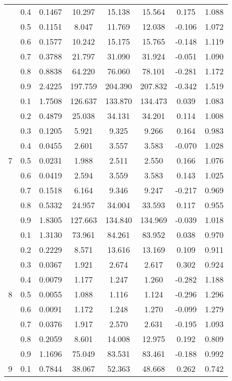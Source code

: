 \documentclass[11pt,a4paper]{report}
\begin{document}
\begin{longtable}{ | c | c || c | c | c | c | c | c | }
 & 0.4 & 0.1467 & 10.297 & 15.138 & 15.564 & 0.175 & 1.088 \\
 & 0.5 & 0.1151 & 8.047 & 11.769 & 12.038 & -0.106 & 1.072 \\
 & 0.6 & 0.1577 & 10.242 & 15.175 & 15.765 & -0.148 & 1.119 \\
 & 0.7 & 0.3788 & 21.797 & 31.090 & 31.924 & -0.051 & 1.090 \\
 & 0.8 & 0.8838 & 64.220 & 76.060 & 78.101 & -0.281 & 1.172 \\
 & 0.9 & 2.4225 & 197.759 & 204.390 & 207.832 & -0.342 & 1.519 \\
 \hline
\multirow{9}{*}{7} & 0.1 & 1.7508 & 126.637 & 133.870 & 134.473 & 0.039 & 1.083 \\
 & 0.2 & 0.4879 & 25.038 & 34.131 & 34.201 & 0.114 & 1.008 \\
 & 0.3 & 0.1205 & 5.921 & 9.325 & 9.266 & 0.164 & 0.983 \\
 & 0.4 & 0.0455 & 2.601 & 3.557 & 3.583 & -0.070 & 1.028 \\
 & 0.5 & 0.0231 & 1.988 & 2.511 & 2.550 & 0.166 & 1.076 \\
 & 0.6 & 0.0419 & 2.594 & 3.559 & 3.583 & 0.143 & 1.025 \\
 & 0.7 & 0.1518 & 6.164 & 9.346 & 9.247 & -0.217 & 0.969 \\
 & 0.8 & 0.5332 & 24.957 & 34.004 & 33.593 & 0.117 & 0.955 \\
 & 0.9 & 1.8305 & 127.663 & 134.840 & 134.969 & -0.039 & 1.018 \\
 \hline
\multirow{9}{*}{8} & 0.1 & 1.3130 & 73.961 & 84.261 & 83.952 & 0.038 & 0.970 \\
 & 0.2 & 0.2229 & 8.571 & 13.616 & 13.169 & 0.109 & 0.911 \\
 & 0.3 & 0.0367 & 1.921 & 2.674 & 2.617 & 0.302 & 0.924 \\
 & 0.4 & 0.0079 & 1.177 & 1.247 & 1.260 & -0.282 & 1.188 \\
 & 0.5 & 0.0055 & 1.088 & 1.116 & 1.124 & -0.296 & 1.296 \\
 & 0.6 & 0.0091 & 1.172 & 1.248 & 1.270 & -0.099 & 1.279 \\
 & 0.7 & 0.0376 & 1.917 & 2.570 & 2.631 & -0.195 & 1.093 \\
 & 0.8 & 0.2059 & 8.601 & 14.008 & 12.975 & 0.192 & 0.809 \\
 & 0.9 & 1.1696 & 75.049 & 83.531 & 83.461 & -0.188 & 0.992 \\
 \hline
\multirow{9}{*}{9} & 0.1 & 0.7844 & 38.067 & 52.363 & 48.668 & 0.262 & 0.742 \\

\end{longtable}
\end{document}
